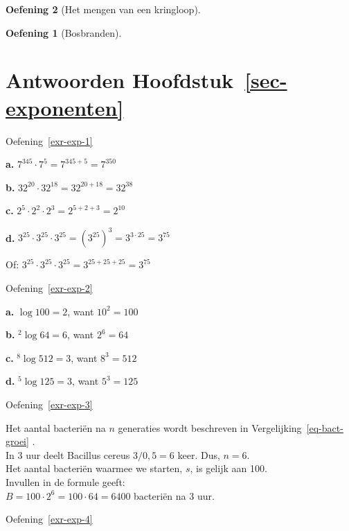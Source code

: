 \documentclass[
  a4paper,
]{scrbook}
\theoremstyle{definition}
\newtheorem{exercise}{Oefening}[chapter]
\theoremstyle{remark}
\begin{document}
\begin{exercise}[Het mengen van een
kringloop]
\begin{exercise}[Bosbranden]
\section*{\texorpdfstring{Antwoorden
Hoofdstuk~\ref{sec-exponenten}}{Antwoorden Hoofdstuk~}}\label{antwoorden-sec-exponenten}


Oefening~\ref{exr-exp-1}

\textbf{a.} \(7^{345} \cdot 7^5 = 7^{345 + 5} = 7^{350}\)

\textbf{b.} \(32^{20} \cdot 32^{18} = 32^{20 + 18} = 32^{38}\)

\textbf{c.} \(2^5 \cdot 2^2 \cdot 2^3 = 2^{5 + 2 + 3} = 2^{10}\)

\textbf{d.}
\(3^{25} \cdot 3^{25} \cdot 3^{25} = (3^{25})^3 = 3^{3 \cdot 25} = 3^{75}\)

Of: \(3^{25} \cdot 3^{25} \cdot 3^{25} = 3^{25+25+25} = 3^{75}\)

Oefening~\ref{exr-exp-2}

\textbf{a.} \(\log{100} = 2\), want \(10^2 = 100\)

\textbf{b.} \(^2\log{64} = 6\), want \(2^6 = 64\)

\textbf{c.} \(^8\log{512} = 3\), want \(8^3 = 512\)

\textbf{d.} \(^5\log{125} = 3\), want \(5^3 = 125\)

Oefening~\ref{exr-exp-3}

Het aantal bacteriën na \(n\) generaties wordt beschreven in
Vergelijking~\ref{eq-bact-groei} .\\
In 3 uur deelt Bacillus cereus \(3 / 0,5 = 6\) keer. Dus, \(n=6\).\\
Het aantal bacteriën waarmee we starten, \(s\), is gelijk aan 100.\\
Invullen in de formule geeft:\\
\(B = 100 \cdot 2^6 = 100 \cdot 64 = 6400\) bacteriën na 3 uur.

Oefening~\ref{exr-exp-4}


\end{exercise}
\end{exercise}
\end{document}
